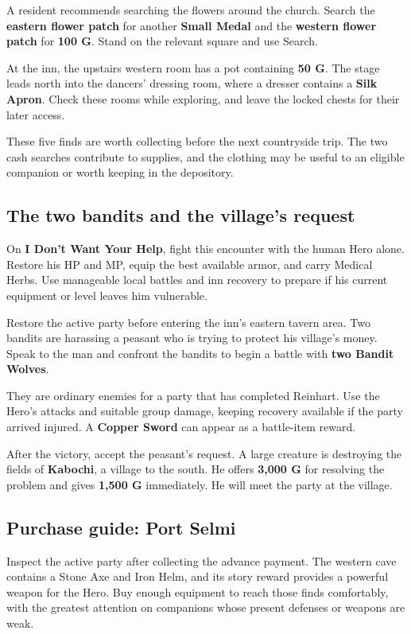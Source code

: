 A resident recommends searching the flowers around the church.
Search the \textbf{eastern flower patch} for another
\textbf{Small Medal} and the \textbf{western flower patch} for
\textbf{100 G}. Stand on the relevant square and use Search.

At the inn, the upstairs western room has a pot containing
\textbf{50 G}. The stage leads north into the dancers' dressing room,
where a dresser contains a \textbf{Silk Apron}. Check these rooms
while exploring, and leave the locked chests for their later access.

These five finds are worth collecting before the next countryside trip.
The two cash searches contribute to supplies, and the clothing may
be useful to an eligible companion or worth keeping in the depository.

\subsection*{The two bandits and the village's request}

On \textbf{I Don't Want Your Help}, fight this encounter with the human
Hero alone. Restore his HP and MP, equip the best available armor, and
carry Medical Herbs. Use manageable local battles and inn recovery to
prepare if his current equipment or level leaves him vulnerable.

Restore the active party before entering the inn's eastern tavern area.
Two bandits are harassing a peasant who is trying to protect his village's
money. Speak to the man and confront the bandits to begin a battle with
\textbf{two Bandit Wolves}.

They are ordinary enemies for a party that has completed Reinhart.
Use the Hero's attacks and suitable group damage, keeping recovery
available if the party arrived injured. A \textbf{Copper Sword}
can appear as a battle-item reward.

After the victory, accept the peasant's request. A large creature is
destroying the fields of \textbf{Kabochi}, a village to the south.
He offers \textbf{3,000 G} for resolving the problem and gives
\textbf{1,500 G} immediately. He will meet the party at the village.

\subsection*{Purchase guide: Port Selmi}

Inspect the active party after collecting the advance payment. The
western cave contains a Stone Axe and Iron Helm, and its story reward
provides a powerful weapon for the Hero. Buy enough equipment to reach
those finds comfortably, with the greatest attention on companions
whose present defenses or weapons are weak.

